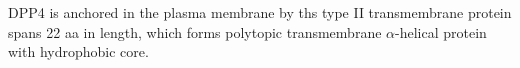 
DPP4 is anchored in the plasma membrane by ths type II transmembrane protein spans 22 aa in length, which forms polytopic transmembrane $\alpha$-helical protein with hydrophobic core.~\cite{Hong_1990}